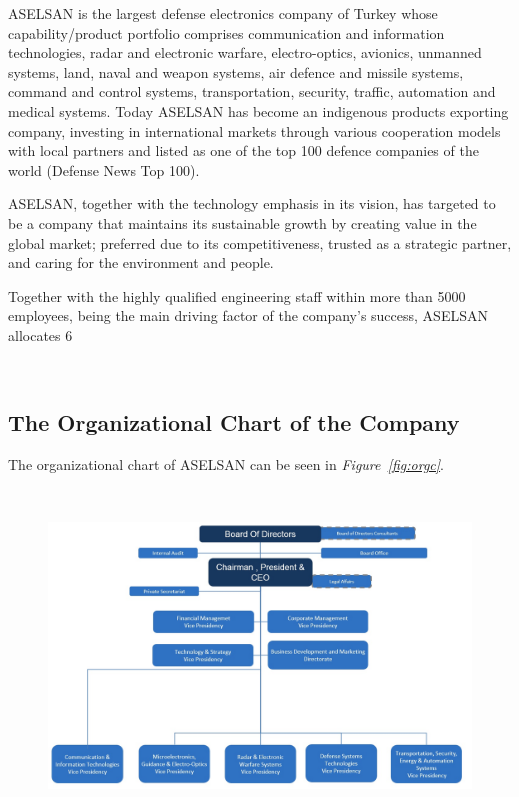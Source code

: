 	ASELSAN is the largest defense electronics company of Turkey whose capability/product portfolio comprises communication and information technologies, radar and electronic warfare, electro-optics, avionics, unmanned systems, land, naval and weapon systems, air defence and missile systems, command and control systems, transportation, security, traffic, automation and medical systems. Today ASELSAN has become an indigenous products exporting company, investing in international markets through various cooperation models with local partners and listed as one of the top 100 defence companies of the world (Defense News Top 100).

	ASELSAN, together with the technology emphasis in its vision, has targeted to be a company that maintains its sustainable growth by creating value in the global market; preferred due to its competitiveness, trusted as a strategic partner, and caring for the environment and people.

	Together with the highly qualified engineering staff within more than 5000 employees, being the main driving factor of the company's success, ASELSAN allocates 6%

​​
\subsection{The Organizational Chart of the Company}
\-
\indent
The organizational chart of ASELSAN can be seen in \textit{Figure~\ref{fig:orgc}}.

\
\begin{figure}[H]
\center
\setlength{\unitlength}{\textwidth} 
\includegraphics[width=0.75\unitlength]{organizasyon}
\caption{\label{{fig:orgc}The Organizational Chart of ASELSAN }}
\end{figure}
	

